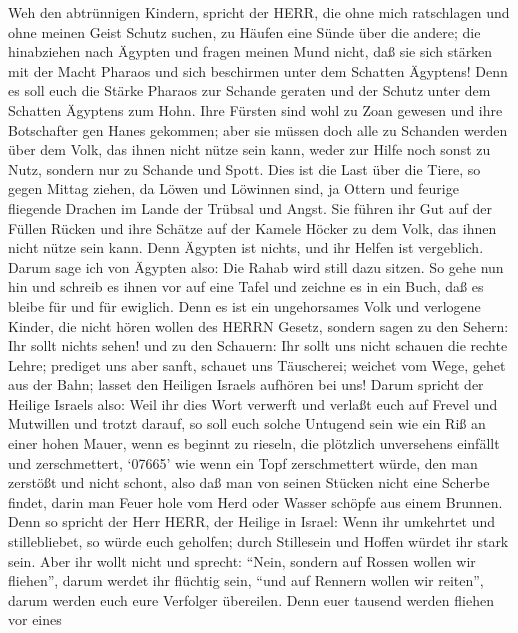  Weh den abtrünnigen Kindern, spricht der HERR, die ohne
mich ratschlagen und ohne meinen Geist Schutz suchen, zu Häufen eine
Sünde über die andere;  die hinabziehen nach Ägypten und
fragen meinen Mund nicht, daß sie sich stärken mit der Macht Pharaos und
sich beschirmen unter dem Schatten Ägyptens!  Denn es soll
euch die Stärke Pharaos zur Schande geraten und der Schutz unter dem
Schatten Ägyptens zum Hohn.  Ihre Fürsten sind wohl zu Zoan
gewesen und ihre Botschafter gen Hanes gekommen;  aber sie
müssen doch alle zu Schanden werden über dem Volk, das ihnen nicht nütze
sein kann, weder zur Hilfe noch sonst zu Nutz, sondern nur zu Schande
und Spott.  Dies ist die Last über die Tiere, so gegen
Mittag ziehen, da Löwen und Löwinnen sind, ja Ottern und feurige
fliegende Drachen im Lande der Trübsal und Angst. Sie führen ihr Gut auf
der Füllen Rücken und ihre Schätze auf der Kamele Höcker zu dem Volk,
das ihnen nicht nütze sein kann.  Denn Ägypten ist nichts,
und ihr Helfen ist vergeblich. Darum sage ich von Ägypten also: Die
Rahab wird still dazu sitzen.  So gehe nun hin und schreib
es ihnen vor auf eine Tafel und zeichne es in ein Buch, daß es bleibe
für und für ewiglich.  Denn es ist ein ungehorsames Volk und
verlogene Kinder, die nicht hören wollen des HERRN Gesetz, 
sondern sagen zu den Sehern: Ihr sollt nichts sehen! und zu den
Schauern: Ihr sollt uns nicht schauen die rechte Lehre; prediget uns
aber sanft, schauet uns Täuscherei;  weichet vom Wege,
gehet aus der Bahn; lasset den Heiligen Israels aufhören bei uns!
 Darum spricht der Heilige Israels also: Weil ihr dies Wort
verwerft und verlaßt euch auf Frevel und Mutwillen und trotzt darauf,
 so soll euch solche Untugend sein wie ein Riß an einer
hohen Mauer, wenn es beginnt zu rieseln, die plötzlich unversehens
einfällt und zerschmettert,  `07665' wie wenn ein Topf
zerschmettert würde, den man zerstößt und nicht schont, also daß man von
seinen Stücken nicht eine Scherbe findet, darin man Feuer hole vom Herd
oder Wasser schöpfe aus einem Brunnen.  Denn so spricht der
Herr HERR, der Heilige in Israel: Wenn ihr umkehrtet und stillebliebet,
so würde euch geholfen; durch Stillesein und Hoffen würdet ihr stark
sein. Aber ihr wollt nicht  und sprecht: ``Nein, sondern
auf Rossen wollen wir fliehen'', darum werdet ihr flüchtig sein, ``und
auf Rennern wollen wir reiten'', darum werden euch eure Verfolger
übereilen.  Denn euer tausend werden fliehen vor eines
